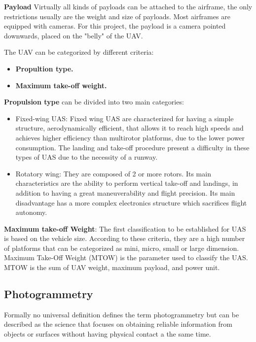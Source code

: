 \textbf{Payload} Virtually all kinds of payloads can be attached to the airframe, the only restrictions usually are the weight and size of payloads. Most airframes are equipped with cameras. For this project, the payload is a camera pointed downwards, placed on the "belly" of the UAV. 

The UAV can be categorized by different criteria: 
\begin{itemize}
    \item \textbf{Propultion type.}
    \item  \textbf{Maximum take-off weight.}
\end{itemize}
\textbf{Propulsion type} can be divided into two main categories:
\begin{itemize}
\item Fixed-wing UAS: Fixed wing UAS are characterized for having a simple structure, aerodynamically efficient, that allows it to reach high speeds and achieves higher efficiency than multirotor platforms, due to the lower power consumption. The landing and take-off procedure present a difficulty in these types of UAS due to the necessity of a runway.
\item Rotatory wing: They are composed of 2 or more rotors. Its main characteristics are the ability to perform vertical take-off and landings, in addition to having a great maneuverability and flight precision. Its main disadvantage has a more complex electronics structure which sacrifices flight autonomy.\cite{Luis_Fernadno}
\end{itemize}

\textbf{Maximum take-off Weight}: The first classification to be established for UAS is based on the vehicle size. According to these criteria, they are a high number of platforms that can be categorized as mini, micro, small or large dimension. Maximum Take-Off Weight (MTOW) is the parameter used to classify the UAS. MTOW is the sum of UAV weight, maximum payload, and power unit.\cite{ICAO}

\subsection{Photogrammetry}
Formally no universal definition defines the term photogrammetry but  can be described as the science that focuses on obtaining  reliable information from objects or surfaces without having physical contact a the same time.\cite{Fotogrametria_digital}

